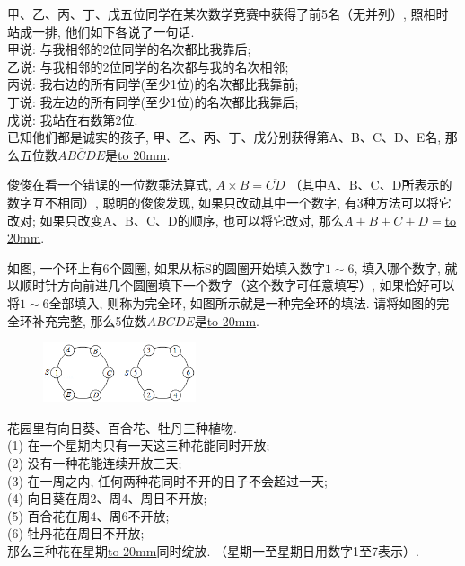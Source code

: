 \item {
    甲、乙、丙、丁、戊五位同学在某次数学竞赛中获得了前5名（无并列）, 照相时站成一排, 他们如下各说了一句话. \\
    甲说: 与我相邻的2位同学的名次都比我靠后; \\
    乙说: 与我相邻的2位同学的名次都与我的名次相邻; \\
    丙说: 我右边的所有同学(至少1位)的名次都比我靠前; \\
    丁说: 我左边的所有同学(至少1位)的名次都比我靠后; \\
    戊说: 我站在右数第2位. \\
    已知他们都是诚实的孩子, 甲、乙、丙、丁、戊分别获得第A、B、C、D、E名, 那么五位数$\overline{ABCDE}$是\underline{\hbox to 20mm{}}.
    \vspace{1cm}
}

\item {
    俊俊在看一个错误的一位数乘法算式, $A\times B=\overline{CD}$ （其中A、B、C、D所表示的数字互不相同）, 聪明的俊俊发现, 如果只改动其中一个数字, 有3种方法可以将它改对; 如果只改变A、B、C、D的顺序, 也可以将它改对, 那么$A+B+C+D=$\underline{\hbox to 20mm{}}.
    \vspace{1cm}
}

\item {
    如图, 一个环上有6个圆圈, 如果从标S的圆圈开始填入数字$1\sim 6$, 填入哪个数字, 就以顺时针方向前进几个圆圈填下一个数字（这个数字可任意填写）, 如果恰好可以将$1\sim 6$全部填入, 则称为完全环, 如图所示就是一种完全环的填法. 请将如图的完全环补充完整, 那么5位数$ABCDE$是\underline{\hbox to 20mm{}}.
    \begin{figure}[H]
        \centering
        \includegraphics[width=0.4\textwidth]{./pics/Chapter_5/2016_3.png}
    \end{figure}
    \vspace{1cm}
}

\item {
    花园里有向日葵、百合花、牡丹三种植物. \\
    (1) 在一个星期内只有一天这三种花能同时开放; \\
    (2) 没有一种花能连续开放三天; \\
    (3) 在一周之内, 任何两种花同时不开的日子不会超过一天; \\
    (4) 向日葵在周2、周4、周日不开放; \\
    (5) 百合花在周4、周6不开放; \\
    (6) 牡丹花在周日不开放; \\
    那么三种花在星期\underline{\hbox to 20mm{}}同时绽放. （星期一至星期日用数字1至7表示）. 
    \vspace{1cm}
}